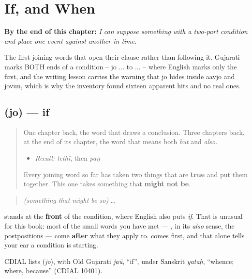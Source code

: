 
\chapter{If, and When}
\label{ch:gu-if-and-when}

\begin{chapteropening}
\textbf{By the end of this chapter:} \emph{I can suppose something with a two-part condition and place one event against another in time.}

The first joining words that open their clause rather than following it. Gujarati marks BOTH ends of a condition -- jo ... to ... -- where English marks only the first, and the writing lesson carries the warning that jo hides inside aavjo and jovun, which is why the inventory found sixteen apparent hits and no real ones.
\end{chapteropening}

\section[\texorpdfstring{\gu{જો} (jo)}{જો (jo)}]{ (jo) — if}

\label{lesson:GU-C35-jo}



\begin{quote}
One chapter back, the word that draws a conclusion. Three chapters back, at the end of its chapter, the word that means both \emph{but} and \emph{also}.

\begin{itemize}
\raggedright
  \item \emph{Recall:} \emph{tethī}, then \emph{paṇ}
\end{itemize}

Every joining word so far has taken two things that are \textbf{true} and put them together. This one takes something that \textbf{might not be}.
\end{quote}

\begin{cousinweb}
\begin{quote}
\textbf{} \emph{(something that might be so)} …
\end{quote}

\textbf{} stands at the \textbf{front} of the condition, where English also puts \emph{if}. That is unusual for this book: most of the small words you have met — \textbf{}, \textbf{} in its \emph{also} sense, the postpositions — come \textbf{after} what they apply to. \textbf{} comes first, and that alone tells your ear a condition is starting.

CDIAL lists \textbf{} (\emph{jo}), with Old Gujarati \emph{jaü}, \textquotedblleft{}if\textquotedblright{}, under Sanskrit \emph{yataḥ}, \textquotedblleft{}whence; where, because\textquotedblright{} (CDIAL 10401).
\end{cousinweb}

